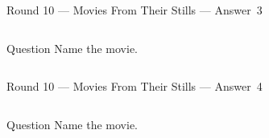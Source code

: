 \documentclass[11pt]{beamer}
\begin{document}
\begin{frame}[t]{Round 10 --- Movies From Their Stills --- \mbox{Answer 3}}
    \vspace{-0.5em}
    \begin{columns}[T,totalwidth=\linewidth]
        \begin{column}{0.32\linewidth}
            \begin{block}{Question}
                Name the movie.
            \end{block}
        \end{column}
        \begin{column}{0.65\linewidth}
            \begin{center}
                \texttt{[image: \{Images/seven-yearitch]}.jpg}
            \end{center}
        \end{column}
    \end{columns}
\end{frame}
\begin{frame}[t]{Round 10 --- Movies From Their Stills --- \mbox{Answer 4}}
    \vspace{-0.5em}
    \begin{columns}[T,totalwidth=\linewidth]
        \begin{column}{0.32\linewidth}
            \begin{block}{Question}
                Name the movie.
            \end{block}
        \end{column}
        \begin{column}{0.65\linewidth}
            \begin{center}
                \texttt{[image: \{Images/bhc]}.jpg}
            \end{center}
        \end{column}
    \end{columns}
\end{frame}
\end{document}

